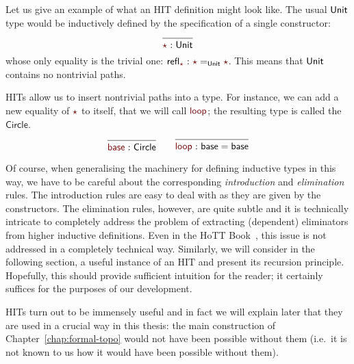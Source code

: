 Let us give an example of what an HIT definition might look like. The usual $\mathsf{Unit}{}$
type would be inductively defined by the specification of a single constructor:
\begin{equation*}
  \begin{prooftree}
    \infer0{\oftyI{\rulename{\star}}{\unitty{}}}
  \end{prooftree}
\end{equation*}
whose only equality is the trivial one:
$\oftyI{\mathsf{refl}_{\rulename{\star}}}{\rulename{\star} =_{\unitty{}} \rulename{\star}}$. This means
that $\mathsf{Unit}{}$ contains no nontrivial paths.

HITs allow us to insert nontrivial paths into a type. For instance, we can add a new
equality of $\rulename{\star}$ to itself, that we will call $\rulename{loop}$; the resulting
type is called the $\mathsf{Circle}$.
\begin{equation*}
  \begin{prooftree}
    \infer0[]{\oftyI{\rulename{base}}{\mathsf{Circle}}}
  \end{prooftree}
  \hspace{2em}
  \begin{prooftree}
    \infer0[]{\oftyI{\rulename{loop}}{\mathsf{base} = \mathsf{base}}}
  \end{prooftree}
\end{equation*}

Of course, when generalising the machinery for defining inductive types in this way, we
have to be careful about the corresponding \emph{introduction} and \emph{elimination}
rules. The introduction rules are easy to deal with as they are given by the constructors.
The elimination rules, however, are quite subtle and it is technically intricate to
completely address the problem of extracting (dependent) eliminators from higher inductive
definitions. Even in the HoTT Book~\cite[Sec.~6.2]{hottbook}, this issue is not addressed
in a completely technical way. Similarly, we will consider in the following section, a
useful instance of an HIT and present its recursion principle. Hopefully, this should
provide sufficient intuition for the reader; it certainly suffices for the purposes of
our development.

HITs turn out to be immensely useful and in fact we will explain later that they are used
in a crucial way in this thesis: the main construction of Chapter~\ref{chap:formal-topo}
would not have been possible without them (i.e.~it is not known to us how it would have
been possible without them).

